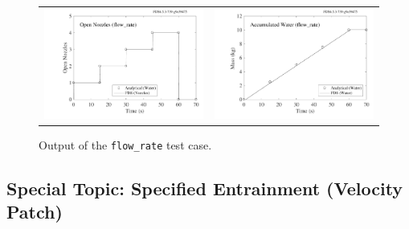 \documentclass[11pt]{book}
\newcommand{\ct}{\tt\small}
\begin{document}
\begin{figure}[ht]
\begin{tabular*}{\textwidth}{lr}
\includegraphics[width=3.2in]{SCRIPT_FIGURES/flow_rate_open_nozzles} &
\includegraphics[width=3.2in]{SCRIPT_FIGURES/flow_rate_water_mass}
\end{tabular*}
\caption[Results of the {\ct flow\_rate} test case]{Output of the {\ct flow\_rate} test case.}
\label{flow_rate}
\end{figure}

\subsection{Special Topic: Specified Entrainment (Velocity Patch)}
\label{info:velocity_patch}
\end{document}
